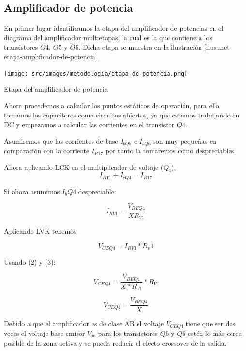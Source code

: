 \subsection{Amplificador de potencia}

En primer lugar identificamos la etapa del amplificador de potencias en el diagrama del amplificador multietapas, la cual es la que contiene a los transistores $Q4$, $Q5$ y $Q6$. Dicha etapa se muestra en la ilustración \ref{ilus:met-etapa-amplificador-de-potencia}.

\begin{ilustracion}[ht]
    \centering
    \texttt{[image: src/images/metodología/etapa-de-potencia.png]}
    \caption{Etapa del amplificador de potencia}
    \label{ilus:met-etapa-amplificador-de-potencia}
\end{ilustracion}

Ahora procedemos a calcular los puntos estáticos de operación, para ello tomamos los capacitores como circuitos abiertos, ya que estamos trabajando en DC y empezamos a calcular las corrientes en el transistor $Q4$.

Asumiremos que las corrientes de base $I_{bQ5}$ e $I_{bQ6}$ son muy pequeñas en comparación con la corriente $I_{R17}$ por tanto la tomaremos como despreciables.

Ahora aplicando LCK en el multiplicador de voltaje ($Q_4$):
\begin{equation}
I_{RV1} + I_{cQ4} = I_{R17}    
\end{equation}

Si ahora asumimos $I_bQ4$ despreciable:

\begin{equation}
    I_{RV1} = \frac{V_{BEQ4}}{XR_{V1}}
\end{equation}

Aplicando LVK tenemos:

\begin{equation}
    V_{CEQ4} = I_{RV1} * R_v1
\end{equation}

Usando (2) y (3):

$$ V_{CEQ4} = \frac{V_{BEQ4}}{X*R_{V1}} * R_{V!}$$

\begin{equation}
    V_{CEQ4} = \frac{V_{BEQ4}}{X}
\end{equation}

Debido a que el amplificador es de clase AB el voltaje $V_{CEQ4}$ tiene que ser dos veces el voltaje base emisor $V_{be}$ para los transistores $Q5$ y $Q6$ estén lo más cerca posible de la zona activa y se pueda reducir el efecto crossover de la salida.

